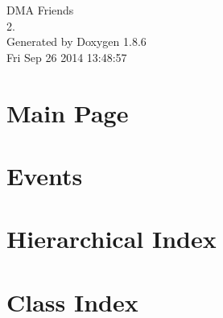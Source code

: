 \documentclass[twoside]{book}
\newcommand{\clearemptydoublepage}{%
  \newpage{\pagestyle{empty}\cleardoublepage}%
}
\begin{document}
\hypersetup{pageanchor=false}
\begin{titlepage}
\vspace*{7cm}
\begin{center}%
{\Large D\-M\-A Friends \\[1ex]\large 2. }\\
\vspace*{1cm}
{\large Generated by Doxygen 1.8.6}\\
\vspace*{0.5cm}
{\small Fri Sep 26 2014 13:48:57}\\
\end{center}
\end{titlepage}
\clearemptydoublepage
\tableofcontents
\clearemptydoublepage
{}
\hypersetup{pageanchor=true}

\chapter{Main Page}
\label{index}\hypertarget{index}{}
\chapter{Events}
\label{df/d0e/md_docs_EVENTS}
\hypertarget{df/d0e/md_docs_EVENTS}{}

\chapter{Hierarchical Index}

\chapter{Class Index}

\end{document}
